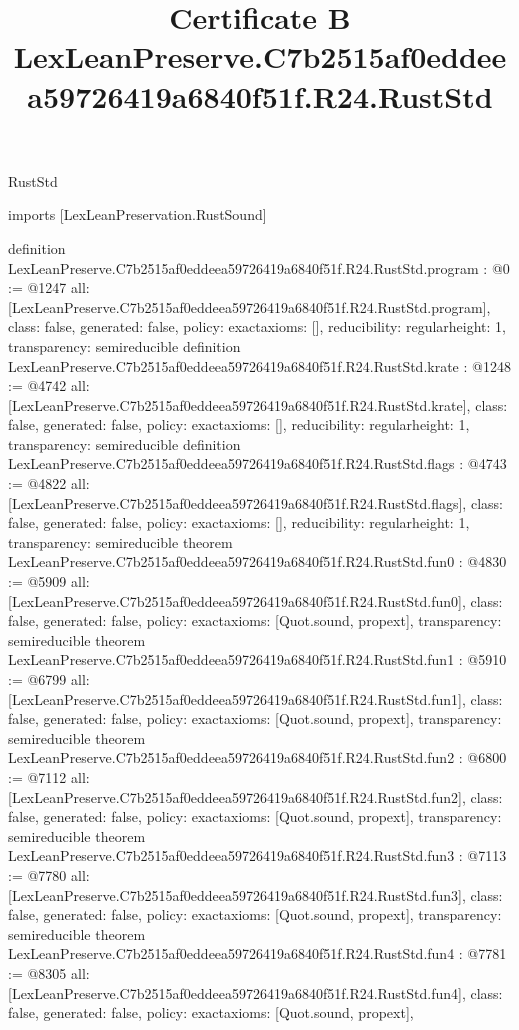 \begin{lexlean}{RustStd}
\title{Certificate B LexLeanPreserve.C7b2515af0eddeea59726419a6840f51f.R24.RustStd}
\begin{coremodule}
imports [LexLeanPreservation.RustSound]

definition LexLeanPreserve.C7b2515af0eddeea59726419a6840f51f.R24.RustStd.program : @0 := @1247 {
  all: [LexLeanPreserve.C7b2515af0eddeea59726419a6840f51f.R24.RustStd.program],
  class: false,
  generated: false,
  policy: exact{axioms: []},
  reducibility: regular{height: 1},
  transparency: semireducible
}
definition LexLeanPreserve.C7b2515af0eddeea59726419a6840f51f.R24.RustStd.krate : @1248 := @4742 {
  all: [LexLeanPreserve.C7b2515af0eddeea59726419a6840f51f.R24.RustStd.krate],
  class: false,
  generated: false,
  policy: exact{axioms: []},
  reducibility: regular{height: 1},
  transparency: semireducible
}
definition LexLeanPreserve.C7b2515af0eddeea59726419a6840f51f.R24.RustStd.flags : @4743 := @4822 {
  all: [LexLeanPreserve.C7b2515af0eddeea59726419a6840f51f.R24.RustStd.flags],
  class: false,
  generated: false,
  policy: exact{axioms: []},
  reducibility: regular{height: 1},
  transparency: semireducible
}
theorem LexLeanPreserve.C7b2515af0eddeea59726419a6840f51f.R24.RustStd.fun0 : @4830 := @5909 {
  all: [LexLeanPreserve.C7b2515af0eddeea59726419a6840f51f.R24.RustStd.fun0],
  class: false,
  generated: false,
  policy: exact{axioms: [Quot.sound, propext]},
  transparency: semireducible
}
theorem LexLeanPreserve.C7b2515af0eddeea59726419a6840f51f.R24.RustStd.fun1 : @5910 := @6799 {
  all: [LexLeanPreserve.C7b2515af0eddeea59726419a6840f51f.R24.RustStd.fun1],
  class: false,
  generated: false,
  policy: exact{axioms: [Quot.sound, propext]},
  transparency: semireducible
}
theorem LexLeanPreserve.C7b2515af0eddeea59726419a6840f51f.R24.RustStd.fun2 : @6800 := @7112 {
  all: [LexLeanPreserve.C7b2515af0eddeea59726419a6840f51f.R24.RustStd.fun2],
  class: false,
  generated: false,
  policy: exact{axioms: [Quot.sound, propext]},
  transparency: semireducible
}
theorem LexLeanPreserve.C7b2515af0eddeea59726419a6840f51f.R24.RustStd.fun3 : @7113 := @7780 {
  all: [LexLeanPreserve.C7b2515af0eddeea59726419a6840f51f.R24.RustStd.fun3],
  class: false,
  generated: false,
  policy: exact{axioms: [Quot.sound, propext]},
  transparency: semireducible
}
theorem LexLeanPreserve.C7b2515af0eddeea59726419a6840f51f.R24.RustStd.fun4 : @7781 := @8305 {
  all: [LexLeanPreserve.C7b2515af0eddeea59726419a6840f51f.R24.RustStd.fun4],
  class: false,
  generated: false,
  policy: exact{axioms: [Quot.sound, propext]},
}
\end{coremodule}
\end{lexlean}
